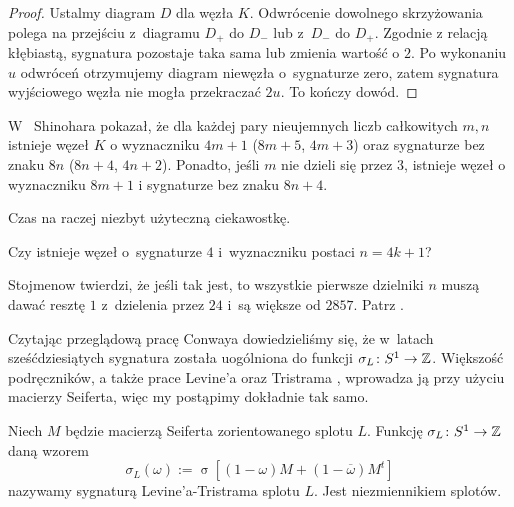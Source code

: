 \begin{proof}
    Ustalmy diagram $D$ dla węzła $K$.
    Odwrócenie dowolnego skrzyżowania polega na przejściu z~diagramu $D_+$ do $D_-$ lub z~$D_-$ do $D_+$.
    Zgodnie z relacją kłębiastą, sygnatura pozostaje taka sama lub zmienia wartość o $2$.
    Po wykonaniu $u$ odwróceń otrzymujemy diagram niewęzła o~sygnaturze zero, zatem sygnatura wyjściowego węzła nie mogła przekraczać $2u$.
    To kończy dowód.
\end{proof}

W~\cite{shinohara1971} Shinohara pokazał, że dla każdej pary nieujemnych liczb całkowitych $m, n$ istnieje węzeł $K$ o wyznaczniku $4m+1$ ($8m+5$, $4m+3$) oraz sygnaturze bez znaku $8n$ ($8n+4$, $4n+2$).
%
%
Ponadto, jeśli $m$ nie dzieli się przez $3$, istnieje węzeł o wyznaczniku $8m+1$ i sygnaturze bez znaku $8n+4$.

Czas na raczej niezbyt użyteczną ciekawostkę.

\begin{conjecture}
    Czy istnieje węzeł o~sygnaturze $4$ i~wyznaczniku postaci $n = 4k + 1$?
\end{conjecture}

Stojmenow twierdzi, że jeśli tak jest, to wszystkie pierwsze dzielniki $n$ muszą dawać resztę $1$ z~dzielenia przez $24$ i~są większe od $2857$.
%
Patrz \cite[s. 540]{ohtsuki2002}.

Czytając przeglądową pracę Conwaya \cite{conway2019} dowiedzieliśmy się, że w~latach sześćdziesiątych sygnatura została uogólniona do funkcji $\sigma_L \colon S^1 \to \mathbb Z$.
%
Większość podręczników, a także prace Levine'a \cite{levine1969} oraz Tristrama \cite{tristram1969}, wprowadza ją przy użyciu macierzy Seiferta, więc my postąpimy dokładnie tak samo.
%
%

\begin{definition}
%
    Niech $M$ będzie macierzą Seiferta zorientowanego splotu $L$.
    Funkcję $\sigma_L \colon S^1 \to \mathbb Z$ daną wzorem
    \begin{equation}
        \sigma_L(\omega) := \operatorname{\sigma} [(1-\omega) M + (1 - \overline{\omega})M^t]
    \end{equation}
    nazywamy sygnaturą Levine'a-Tristrama splotu $L$.
    Jest niezmiennikiem splotów.
\end{definition}

